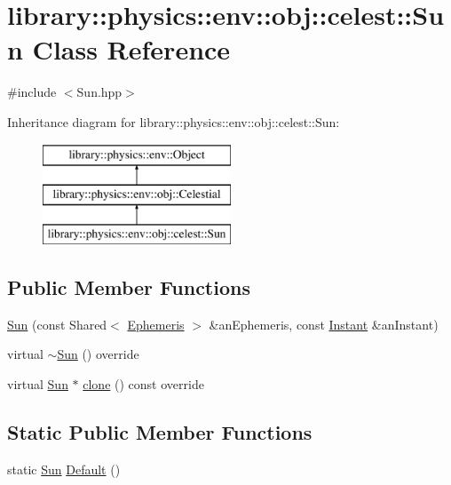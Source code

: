 \hypertarget{classlibrary_1_1physics_1_1env_1_1obj_1_1celest_1_1_sun}{}\section{library\+:\+:physics\+:\+:env\+:\+:obj\+:\+:celest\+:\+:Sun Class Reference}
\label{classlibrary_1_1physics_1_1env_1_1obj_1_1celest_1_1_sun}


{\ttfamily \#include $<$Sun.\+hpp$>$}

Inheritance diagram for library\+:\+:physics\+:\+:env\+:\+:obj\+:\+:celest\+:\+:Sun\+:\begin{figure}[H]
\begin{center}
\leavevmode
\includegraphics[height=3.000000cm]{classlibrary_1_1physics_1_1env_1_1obj_1_1celest_1_1_sun}
\end{center}
\end{figure}
\subsection*{Public Member Functions}
\begin{DoxyCompactItemize}
\item 
\hyperlink{classlibrary_1_1physics_1_1env_1_1obj_1_1celest_1_1_sun_a20417f820f88fc392046cde89cce8815}{Sun} (const Shared$<$ \hyperlink{classlibrary_1_1physics_1_1env_1_1_ephemeris}{Ephemeris} $>$ \&an\+Ephemeris, const \hyperlink{classlibrary_1_1physics_1_1time_1_1_instant}{Instant} \&an\+Instant)
\item 
virtual \hyperlink{classlibrary_1_1physics_1_1env_1_1obj_1_1celest_1_1_sun_a34a14e47bbbc26292809dba9c8d1ece8}{$\sim$\+Sun} () override
\item 
virtual \hyperlink{classlibrary_1_1physics_1_1env_1_1obj_1_1celest_1_1_sun}{Sun} $\ast$ \hyperlink{classlibrary_1_1physics_1_1env_1_1obj_1_1celest_1_1_sun_a79fa2d336dad399c3d933b0f5a2f9427}{clone} () const override
\end{DoxyCompactItemize}
\subsection*{Static Public Member Functions}
\begin{DoxyCompactItemize}
\item 
static \hyperlink{classlibrary_1_1physics_1_1env_1_1obj_1_1celest_1_1_sun}{Sun} \hyperlink{classlibrary_1_1physics_1_1env_1_1obj_1_1celest_1_1_sun_a4854f1ce74cbabb804d0084b71e76bcf}{Default} ()
\end{DoxyCompactItemize}
